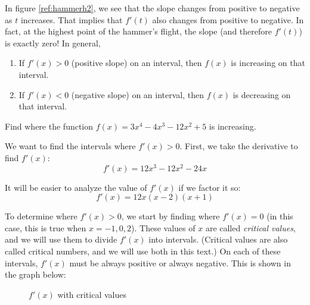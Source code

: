 In figure \ref{ref:hammerh2}, we see that the slope changes from positive to 
negative as $t$ increases. That implies that $f'(t)$ also changes from positive 
to negative. In fact, at the highest point of the hammer's flight, the slope 
(and therefore $f'(t)$) is exactly zero! In general, 
\begin{enumerate}
	\item If $f'(x)>0$ (positive slope) on an interval, then $f(x)$ is increasing on that 
	interval.
	\item If $f'(x)<0$ (negative slope) on an interval, then $f(x)$ is decreasing on that 
	interval. 
\end{enumerate}


\begin{Worked}
\begin{Problem}
Find where the function $f(x) = 3x^4-4x^3-12x^2+5$ is increasing.
\end{Problem}
\begin{Solution}
We want to find the intervals where $f'(x)>0$. First, we take the
derivative to find $f'(x)$:
$$f'(x) = 12x^3-12x^2-24x$$

It will be easier to analyze the value of $f'(x)$ if we factor it so:
$$f'(x) = 12x(x-2)(x+1)$$

To determine where $f'(x)>0$, we start by finding where $f'(x)=0$ (in this 
case, this is true when $x=-1, 0, 2$). These values of $x$ are called \textit{
critical values}, and we will use them to divide $f'(x)$ into intervals. 
(Critical values are also called critical numbers, and we will use both in 
this text.) On each of these intervals, $f'(x)$ must be always positive or 
always negative. This is shown in the graph below:

\begin{figure}[H]
	\centering
	\caption{$f'(x)$ with critical values}
	\label{fig:critval1}
\end{figure}



\end{Solution}
\end{Worked}
